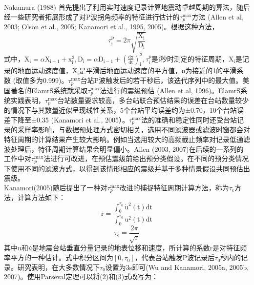 \indent Nakamura (1988) 首先提出了利用实时速度记录计算地震动卓越周期的算法，随后经一些研究者拓展形成了对P波拐角频率的特征进行估计的$\tau_{p}^{\max }$方法 (Allen et al, 2003; Olson et al., 2005; Kanamori et al., 1995, 2005)。根据这种方法，\\
\begin{equation}
\tau_{\mathrm{i}}^{\mathrm{p}}=2 \pi \sqrt{\frac{\mathrm{X}_{\mathrm{i}}}{\mathrm{D}_{\mathrm{i}}}}
\end{equation}
式中，$\mathrm{X}_{\mathrm{i}}=\alpha \mathrm{X}_{\mathrm{i}-1}+\mathrm{x}_{\mathrm{i}}^{2}, \mathrm{D}_{\mathrm{i}}=\alpha \mathrm{D}_{\mathrm{i}-1}+\left(\frac{\mathrm{dx}}{\mathrm{dt}}\right)_{\mathrm{i}}^{2}, \tau_{i}^{p}$是i秒时测定的特征周期，$\mathrm{X}_{\mathrm{i}}$是记录的地面运动速度值，$\mathrm{X}_{\mathrm{i}}$是平滑后地面运动速度的平方值，α为接近的1的平滑系数 (取值多为0.999)。$\tau_{p}^{\max}$台站P波触发后的若干秒后，该迭代序列中的最大值。美国著名的ElamrS系统就采取$\tau_{p}^{\max }$法进行的震级预估 (Allen et al, 1996)。ElamrS系统实践表明，$\tau_{p}^{\max}$台站数量要求较高，多台站联合预估结果的误差在台站数量较少的情况下与其数量近似呈现线性关系，5个台站平均误差约为±0.70，10个台站误差下降至±0.35 (Kanamori et al., 2005）。$\tau_{p}^{\max}$法的准确和稳定性同时还受台站记录的采样率影响，与数据预处理方式密切相关，选用不同滤波器或滤波时窗都会对特征周期的计算结果产生较大影响。例如当选用较大的高频截止频率对记录低通滤波处理后，特征周期计算结果会明显偏小。Allen (2003, 2007)在后续的一系列的工作中对$\tau_{p}^{\max}$法进行可改进，在预估震级前给出预分类假设。在不同的预分类情况下使用不同的滤波方式，以得到该情形相应的震级并基于多种情景假设共同预估出震级。\\
\indent Kanamori(2005)随后提出了一种对$\tau_{p}^{\max}$改进的捕捉特征周期计算方法，称为$\tau_{\mathrm{c}}$方法，计算方法如下：\\
\begin{equation}
\mathrm{r}=\frac{\int_{0}^{\tau_{0}} \dot{\mathrm{u}}^{2}(\mathrm{t}) \mathrm{dt}}{\int_{0}^{\tau_{0}} \mathrm{u}^{2}(\mathrm{t}) \mathrm{dt}}
\end{equation}
\begin{equation}
\tau_{\mathrm{c}}=\frac{2 \pi}{\sqrt{\mathrm{r}}}
\end{equation}
其中u和$\dot{u}$̇是地震台站垂直分量记录的地表位移和速度，所计算的系数r是对特征频率平方的一种估计。式中积分区间为$\left[0, \tau_{0}\right]$，代表台站触发P波记录后$\tau_{0}$秒内的记录。研究表明，在大多数情况下$\tau_{0}$设置为3s即可(Wu and Kanamori, 2005a, 2005b, 2007)。使用Parseval定理可以将(2)和(3)式改写为：
